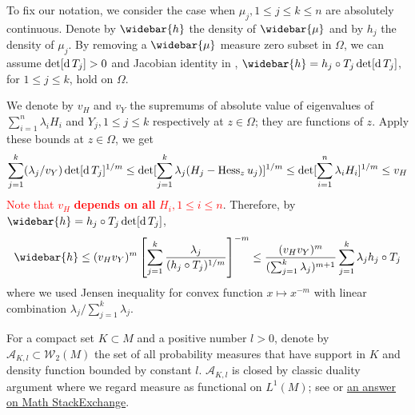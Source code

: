 To fix our notation, we consider the case when $\mu_j, 1 \leq j \leq k \leq n$ are
absolutely continuous.
Denote by $\widebar{h}$ the density of $\widebar{\mu}$ and
by $h_j$ the density of $\mu_j$.
By removing a $\widebar{\mu}$ measure zero subset in $\Omega$,
we can assume $\det [\operatorname{d} T_j] >0$ and
Jacobian identity in ,
$\widebar{h} = h_j \circ T_j \det [\diff T_j]$,
for $ 1\leq j \leq k$, hold on $\Omega$.

We denote by $v_H$ and $v_Y$ the supremums of absolute value
of eigenvalues of $\sum_{i=1}^n \lambda_i H_i$ and $Y_j, 1 \leq j \leq k$
respectively at $z \in \Omega$;
they are functions of $z$.
Apply these bounds at $z \in \Omega$, we get
\begin{equation}
	\label{equa:bound_v_H}
	\sum_{j=1}^k (\lambda_j / v_Y) \det [ \operatorname{d} T_j]^{1/m} \leq
	\det[\sum_{j=1}^k \lambda_j (H_j - \operatorname{Hess}_z u_j)]^{1/m}\leq
	\det [\sum_{i=1}^n \lambda_i H_i]^{1/m}
	\leq v_H
\end{equation}
\textcolor{red}{Note that $v_H$ \textbf{depends on all} $H_i, 1 \leq i \leq n$}.
Therefore, by $\widebar{h} = h_j \circ T_j \det [\diff T_j]$,
\begin{equation}
	\label{equa:density_inequality}
	\widebar{h} \leq (v_H v_Y)^m \left[  \sum_{j=1}^k \frac{ \lambda_j }
		{ (h_j \circ T_j)^{1/m}} \right]^{-m}
	\leq \frac{ (v_H v_Y)^m }{(\sum_{j=1}^k \lambda_j)^{m+1}}
	\sum_{j=1}^k \lambda_j h_j \circ T_j
\end{equation}
where we used Jensen inequality for convex function $x \mapsto x^{-m}$
with linear combination $\lambda_j / \sum_{j=1}^k \lambda_j$.

For a compact set $K \subset M$ and a positive number $l > 0$,
denote by $\mathcal{A}_{K, l} \subset \mathcal{W}_2(M)$ the set of
all probability measures that have support in $K$ and density function bounded by constant $l$.
$\mathcal{A}_{K, l}$ is closed by classic duality argument
where we regard measure as functional on $L^1(M)$;
see \cite[Theorem 4.4.1]{Bogachev2007}
or \href{https://math.stackexchange.com/a/2656637/458137}{an answer on Math StackExchange}.


